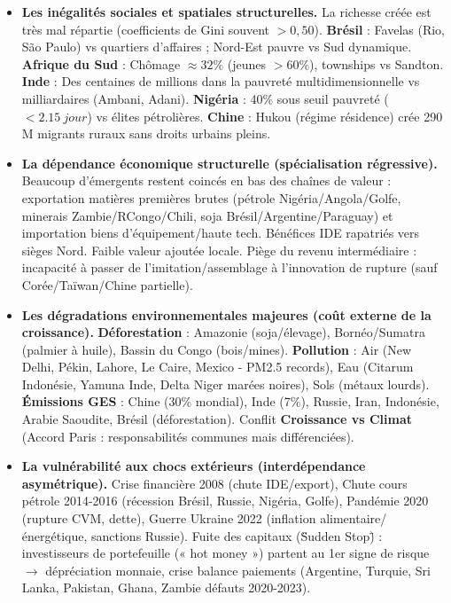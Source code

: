 \documentclass[11pt]{article}
\newcommand{\cle}[1]{{\popxbold\color{popdark}#1}}
\begin{document}
\begin{itemize}
\item \textbf{Les inégalités sociales et spatiales structurelles.} La richesse créée est très mal répartie (coefficients de Gini souvent $> 0,50$). \textbf{Brésil} : Favelas (Rio, São Paulo) vs quartiers d'affaires ; Nord-Est pauvre vs Sud dynamique. \textbf{Afrique du Sud} : Chômage $\approx 32\%$ (jeunes $> 60\%$), townships vs Sandton. \textbf{Inde} : Des centaines de millions dans la pauvreté multidimensionnelle vs milliardaires (Ambani, Adani). \textbf{Nigéria} : 40\% sous seuil pauvreté ($<\SI{2,15}{jour}$) vs élites pétrolières. \textbf{Chine} : Hukou (régime résidence) crée 290 M migrants ruraux sans droits urbains pleins.
\item \textbf{La dépendance économique structurelle (spécialisation régressive).} Beaucoup d'émergents restent coincés en bas des chaînes de valeur : exportation matières premières brutes (pétrole Nigéria/Angola/Golfe, minerais Zambie/RCongo/Chili, soja Brésil/Argentine/Paraguay) et importation biens d'équipement/haute tech. Bénéfices IDE rapatriés vers sièges Nord. Faible valeur ajoutée locale. \cle{Piège du revenu intermédiaire} : incapacité à passer de l'imitation/assemblage à l'innovation de rupture (sauf Corée/Taïwan/Chine partielle).
\item \textbf{Les dégradations environnementales majeures (coût externe de la croissance).} \textbf{Déforestation} : Amazonie (soja/élevage), Bornéo/Sumatra (palmier à huile), Bassin du Congo (bois/mines). \textbf{Pollution} : Air (New Delhi, Pékin, Lahore, Le Caire, Mexico - PM2.5 records), Eau (Citarum Indonésie, Yamuna Inde, Delta Niger marées noires), Sols (métaux lourds). \textbf{Émissions GES} : Chine (30\% mondial), Inde (7\%), Russie, Iran, Indonésie, Arabie Saoudite, Brésil (déforestation). Conflit \textbf{Croissance vs Climat} (Accord Paris : responsabilités communes mais différenciées).
\item \textbf{La vulnérabilité aux chocs extérieurs (interdépendance asymétrique).} Crise financière 2008 (chute IDE/export), Chute cours pétrole 2014-2016 (récession Brésil, Russie, Nigéria, Golfe), Pandémie 2020 (rupture CVM, dette), Guerre Ukraine 2022 (inflation alimentaire/énergétique, sanctions Russie). \cle{Fuite des capitaux} (\"Sudden Stop\") : investisseurs de portefeuille (« hot money ») partent au 1er signe de risque $\to$ dépréciation monnaie, crise balance paiements (Argentine, Turquie, Sri Lanka, Pakistan, Ghana, Zambie défauts 2020-2023).
\end{itemize}
\end{document}
